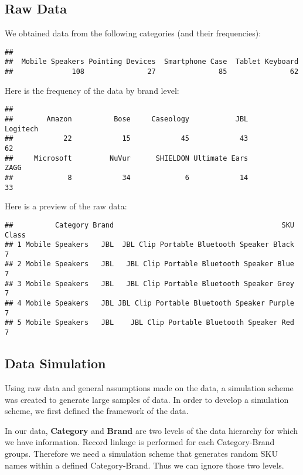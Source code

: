 \documentclass[]{article}
\begin{document}
\subsection{Raw Data}\label{raw-data}

We obtained data from the following categories (and their frequencies):

\begin{verbatim}
## 
##  Mobile Speakers Pointing Devices  Smartphone Case  Tablet Keyboard 
##              108               27               85               62
\end{verbatim}

Here is the frequency of the data by brand level:

\begin{verbatim}
## 
##        Amazon          Bose     Caseology           JBL      Logitech 
##            22            15            45            43            62 
##     Microsoft         NuVur      SHIELDON Ultimate Ears          ZAGG 
##             8            34             6            14            33
\end{verbatim}

Here is a preview of the raw data:

\begin{verbatim}
##          Category Brand                                        SKU Class
## 1 Mobile Speakers   JBL  JBL Clip Portable Bluetooth Speaker Black     7
## 2 Mobile Speakers   JBL   JBL Clip Portable Bluetooth Speaker Blue     7
## 3 Mobile Speakers   JBL   JBL Clip Portable Bluetooth Speaker Grey     7
## 4 Mobile Speakers   JBL JBL Clip Portable Bluetooth Speaker Purple     7
## 5 Mobile Speakers   JBL    JBL Clip Portable Bluetooth Speaker Red     7
\end{verbatim}

\subsection{Data Simulation}\label{data-simulation}

Using raw data and general assumptions made on the data, a simulation
scheme was created to generate large samples of data. In order to
develop a simulation scheme, we first defined the framework of the data.

In our data, \textbf{Category} and \textbf{Brand} are two levels of the
data hierarchy for which we have information. Record linkage is
performed for each Category-Brand groups. Therefore we need a simulation
scheme that generates random SKU names within a defined Category-Brand.
Thus we can ignore those two levels.
\end{document}
